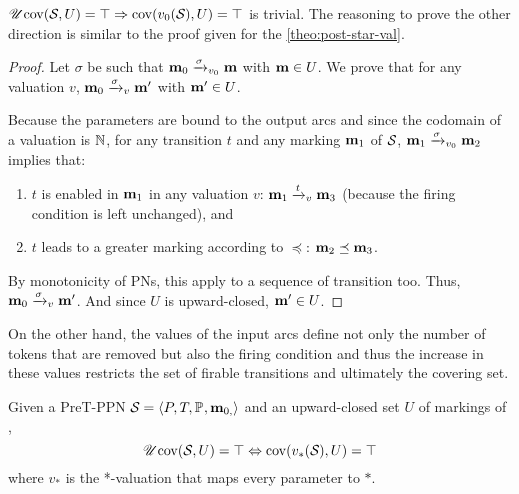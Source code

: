 \(\UcovOp(\namePPN, U) = \top \Rightarrow \covOp(v_0(\namePPN), U) = \top\) is trivial.
The reasoning to prove the other direction is similar to the proof given for the \autoref{theo:post-star-val}.

\begin{proof}
  Let $\sigma$ be such that $\mari \fire[\val_0]{\sigma} \mar$ with $\mar \in U$.
  We prove that for any valuation $v$, $\mari \fire[v]{\sigma} \marp$ with $\marp \in U$.

  Because the parameters are bound to the output arcs and since the codomain of a valuation is $\naturals$, for any transition $t$ and any marking $\mar_1$ of $\namePPN$, $\mar_1 \fire[v_0]{\sigma} \mar_2$ implies that:
  \begin{enumerate}
    \item $t$ is enabled in $\mar_1$ in any valuation $v$: $\mar_1 \fire[v]{t} \mar_3$ (because the firing condition is left unchanged), and
    \item $t$ leads to a greater marking according to $\preceq$: $\mar_2 \preceq \mar_3$.
  \end{enumerate}

  By monotonicity of \acp{PN}, this apply to a sequence of transition too.
  Thus, $\mari \fire[v]{\sigma} \marp$.
  And since $U$ is upward-closed, $\marp \in U$.
\end{proof}

On the other hand, the values of the input arcs define not only the number of tokens that are removed but also the firing condition and thus the increase in these values restricts the set of firable transitions and ultimately the covering set.

\begin{theo}
  \label{theo:pre-u-star-val}
  Given a PreT-\ac{PPN} $\defPPN$ and an upward-closed set $U$ of markings of \namePPN, \[\UcovOp(\namePPN, U) = \top \Leftrightarrow \covOp(v_*(\namePPN), U) = \top\] where $v_*$ is the *-valuation that maps every parameter to $*$.
\end{theo}

